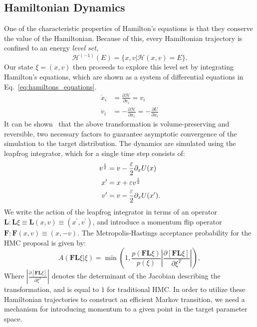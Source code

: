 \documentclass[../main.tex]{subfiles}
\begin{document}
\subsection{Hamiltonian Dynamics}%
\label{subsec:mcmc_hamiltonian_dynamics}
%
One of the characteristic properties of Hamilton's equations is that they
conserve the value of the Hamiltonian.
%
Because of this, every Hamiltonian trajectory is confined to an energy
\emph{level set},
%
\begin{equation}
  \mathcal{H}^{(-1)}(E) = \{x, v | \mathcal{H}(x, v) = E\}.
\end{equation}
%
Our state $\xi = (x, v)$ then proceeds to explore this level set by integrating
Hamilton's equations, which are shown as a system of differential equations in
Eq.~\ref{eq:hamiltons_equations}.
%
%
\begin{align}
    \dot x_i &= \frac{\partial \mathcal{H}}{\partial v_i} = v_i\\
    \dot v_i &= -\frac{\partial \mathcal{H}}{\partial x_i} = - \frac{\partial
        U}{\partial x_i}
\label{eq:hamiltons_equations}
\end{align}
%
It can be shown~\cite{Neal_2012} that the above transformation is
volume-preserving and reversible, two necessary factors to guarantee asymptotic
convergence of the simulation to the target distribution.
%
The dynamics are simulated using the leapfrog integrator, which for a single
time step consists of:
%
\begin{align}
    v^{\frac{1}{2}} &= v - \frac{{\varepsilon}}{2} \partial_x U(x)\\
    x^{\prime} &= x + {\varepsilon} v^{\frac{1}{2}}\\
    v^{\prime} &= v - \frac{{\varepsilon}}{2} \partial_x U(x^{\prime}).
    \label{eq:generic_leapfrog}
\end{align}
%
We write the action of the leapfrog integrator in terms of an operator
$\mathbf{L}: \mathbf{L}\xi \equiv \mathbf{L}(x, v) \equiv (x^{\prime},
v^{\prime})$, and introduce a momentum flip operator $\mathbf{F}: \mathbf{F}(x,
v) \equiv (x, -v)$.
%
The Metropolis-Hastings acceptance probability for the HMC proposal is given
by:
%
\begin{equation}
    A(\mathbf{F}\mathbf{L} \xi | \xi) = \min\left(1,
        \frac{p(\mathbf{F}\mathbf{L}\xi)}{p(\xi)}\left|
        \frac{\partial\left[\mathbf{F}\mathbf{L}\xi\right]}
        {\partial\xi^{T}}\right|\right),
\label{eq:metropolis_hastings}
\end{equation}
%
Where $\left|\frac{\partial\left[\mathbf{F}\mathbf{L}\xi\right]}
{\partial\xi^{T}}\right|$ denotes the determinant of the Jacobian describing
the transformation, and is equal to $1$ for traditional HMC.\@
%
In order to utilize these Hamiltonian trajectories to construct an efficient
Markov transition, we need a mechanism for introducing momentum to a given
point in the target parameter space.
\end{document}
